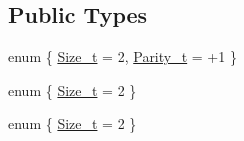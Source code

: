 \subsection*{Public Types}
\begin{DoxyCompactItemize}
\item 
enum \{ \mbox{\hyperlink{structHadron_1_1G1gRep_a661f805947d5452f1e9baa22c45bf6faad934a1096dd73fb4c275c40956d09166}{Size\+\_\+t}} = 2, 
\mbox{\hyperlink{structHadron_1_1G1gRep_a58901bae8955aa1533d90b90b4236dc1afaf2f15984a95be9baaf6c33a0a210ca}{Parity\+\_\+t}} = +1
 \}
\item 
enum \{ \mbox{\hyperlink{structHadron_1_1G1gRep_a661f805947d5452f1e9baa22c45bf6faad934a1096dd73fb4c275c40956d09166}{Size\+\_\+t}} = 2
 \}
\item 
enum \{ \mbox{\hyperlink{structHadron_1_1G1gRep_a661f805947d5452f1e9baa22c45bf6faad934a1096dd73fb4c275c40956d09166}{Size\+\_\+t}} = 2
 \}
\end{DoxyCompactItemize}
